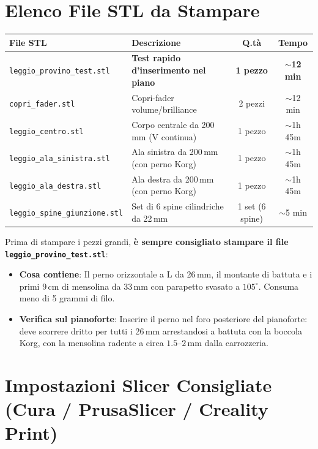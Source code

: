 \documentclass[11pt,a4paper]{article}
\begin{document}
\section{Elenco File STL da Stampare}
\begin{table}[h!]
\centering
\begin{tabular}{@{}llcc@{}}
\toprule
\textbf{File STL} & \textbf{Descrizione} & \textbf{Q.tà} & \textbf{Tempo} \\
\midrule
\texttt{leggio\_provino\_test.stl} & \textbf{Test rapido d'inserimento nel piano} & \textbf{1 pezzo} & \textbf{$\sim$12 min} \\
\texttt{copri\_fader.stl} & Copri-fader volume/brilliance & 2 pezzi & $\sim$12 min \\
\texttt{leggio\_centro.stl} & Corpo centrale da 200\,mm (V continua) & 1 pezzo & $\sim$1h 45m \\
\texttt{leggio\_ala\_sinistra.stl} & Ala sinistra da 200\,mm (con perno Korg) & 1 pezzo & $\sim$1h 45m \\
\texttt{leggio\_ala\_destra.stl} & Ala destra da 200\,mm (con perno Korg) & 1 pezzo & $\sim$1h 45m \\
\texttt{leggio\_spine\_giunzione.stl} & Set di 6 spine cilindriche da 22\,mm & 1 set (6 spine) & $\sim$5 min \\
\bottomrule
\end{tabular}
\end{table}

\begin{tcolorbox}[colback=success!5!white,colframe=success,title=\textbf{Stampa di Prova Rapida: Provino di Test (12 Minuti)}]
Prima di stampare i pezzi grandi, \textbf{è sempre consigliato stampare il file \texttt{leggio\_provino\_test.stl}}:
\begin{itemize}
    \item \textbf{Cosa contiene}: Il perno orizzontale a L da 26\,mm, il montante di battuta e i primi 9\,cm di mensolina da 33\,mm con parapetto svasato a $105^\circ$. Consuma meno di 5 grammi di filo.
    \item \textbf{Verifica sul pianoforte}: Inserire il perno nel foro posteriore del pianoforte: deve scorrere dritto per tutti i 26\,mm arrestandosi a battuta con la boccola Korg, con la mensolina radente a circa $1.5\text{--}2$\,mm dalla carrozzeria.
\end{itemize}
\end{tcolorbox}

\section{Impostazioni Slicer Consigliate (Cura / PrusaSlicer / Creality Print)}
\end{document}
